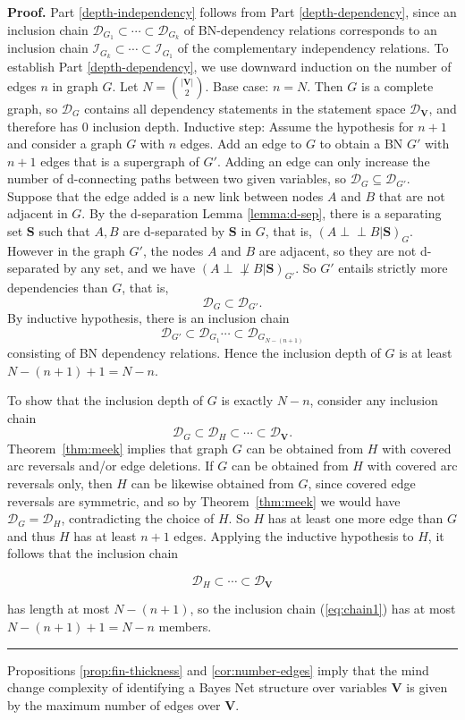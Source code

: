 \documentclass{elsarticle}%
\renewenvironment{proof}[1][Proof]{\noindent\textbf{#1.} }{\ \rule{0.5em}{0.5em}}
\newcommand{\indep}{\ensuremath{\perp{}\!\!\!\!\!\!\!\perp{}}}
\newcommand{\dep}{\ensuremath{{\perp{}\!\!\!\!\!\!\!\not  \perp{}}}}
\renewcommand{\S}{\mathbf{{S}}}
\newcommand{\A}{A}
\newcommand{\B}{B}
\newcommand{\G}{G}
\renewcommand{\H}{H}
\newcommand{\D}{\mathcal{D}}
\newcommand{\I}{\mathcal{I}}
\begin{document}
\begin{proof}
  Part \ref{depth-independency} follows from Part \ref{depth-dependency}, since an inclusion chain $\D_{G_1} \subset \cdots \subset \D_{G_k}$ of BN-dependency relations corresponds to an inclusion chain $\I_{G_k} \subset \cdots \subset \I_{G_1}$ of the complementary independency relations. To establish Part \ref{depth-dependency}, we use downward induction on the number of edges $n$ in graph $G$. Let $N = {\binom{|\mathbf{V}|}{2}}$. 
  Base case: $n = N$. Then $G$ is a complete graph, so $\D_{G}$ contains all dependency statements in the statement space $\D_{\mathbf{V}}$, and therefore has 0 inclusion depth.
  Inductive step: Assume the hypothesis for $n+1$ and consider a graph $G$ with $n$ edges. 
  Add an edge to $G$ to obtain a BN $G'$ with $n+1$ edges that is a supergraph of $G'$. Adding an edge can only increase the number of d-connecting paths between two given variables, so $\D_{G} \subseteq \D_{G'}$. Suppose that the edge added is a new link between nodes $\A$ and $\B$ that are not adjacent in $\G$. By the d-separation Lemma \ref{lemma:d-sep},
there is a separating set $\S$
such that $\A,\B$ are d-separated by $\S$ in $\G$, that is, $(\A \indep \B|\S)_{\G}$. However in the graph $\G'$, the nodes $\A$ and $\B$ are adjacent, so they are not d-separated by any set, and we have $(\A \dep \B|\S)_{\G'}$. So $\G'$ entails strictly more dependencies than $\G$, that is,
$$\D_{G} \subset \D_{G'}.$$ By inductive hypothesis, there is an inclusion chain 
$$\D_{G'} \subset \D_{G_{1}} \cdots \subset \D_{G_{N-(n+1)}}$$
 consisting of BN dependency relations. Hence the inclusion depth of $G$ is at least $N - (n+1) + 1 = N - n$. 
  
To show that the inclusion depth of $G$ is exactly $N - n$, consider any inclusion chain
\begin{equation} \D_G \subset \D_{H} \subset \cdots \subset \D_{\mathbf{V}}.\label{eq:chain1} \end{equation} 
Theorem~\ref{thm:meek} implies that graph $\G$ can be obtained from $\H$ with covered arc reversals and/or edge deletions. If $\G$ can be obtained from $\H$ with covered arc reversals only, then $\H$ can be likewise obtained from $\G$, since covered edge reversals are symmetric, and so by Theorem~\ref{thm:meek} we would have $\D_{\G} = \D_{\H}$, contradicting the choice of $\H$. So $\H$ has at  least one more edge than $\G$ and thus $\H$ has at least $n+1$ edges. Applying the inductive hypothesis to $\H$, it follows that the inclusion chain 

$$\D_{H} \subset \cdots \subset \D_{\mathbf{V}}$$ 

has length at most $N-(n+1)$, so the inclusion chain (\ref{eq:chain1}) has at most $N - (n+1) + 1 = N - n$ members.
\end{proof}
%
Propositions \ref{prop:fin-thickness} and \ref{cor:number-edges} imply that
the mind change complexity of identifying a Bayes Net structure over variables
\textbf{V} %
is given by the maximum number of edges over
\textbf{V}.
\end{document}
